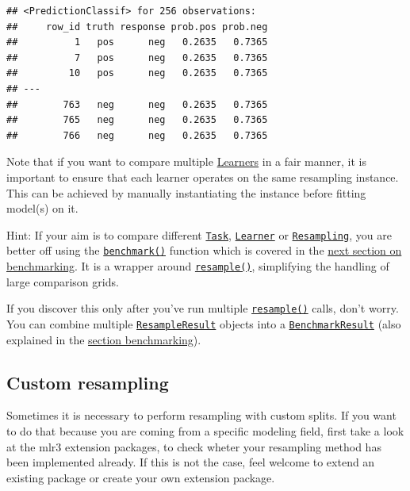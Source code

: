 \documentclass[]{scrbook}
\begin{document}
\begin{verbatim}
## <PredictionClassif> for 256 observations:
##     row_id truth response prob.pos prob.neg
##          1   pos      neg   0.2635   0.7365
##          7   pos      neg   0.2635   0.7365
##         10   pos      neg   0.2635   0.7365
## ---                                        
##        763   neg      neg   0.2635   0.7365
##        765   neg      neg   0.2635   0.7365
##        766   neg      neg   0.2635   0.7365
\end{verbatim}

Note that if you want to compare multiple \protect\hyperlink{learners}{Learners} in a fair manner, it is important to ensure that each learner operates on the same resampling instance.
This can be achieved by manually instantiating the instance before fitting model(s) on it.

Hint: If your aim is to compare different \href{https://mlr3.mlr-org.com/reference/Task.html}{\texttt{Task}}, \href{https://mlr3.mlr-org.com/reference/Learner.html}{\texttt{Learner}} or \href{https://mlr3.mlr-org.com/reference/Resampling.html}{\texttt{Resampling}}, you are better off using the \href{https://mlr3.mlr-org.com/reference/benchmark.html}{\texttt{benchmark()}} function which is covered in the \protect\hyperlink{benchmarking}{next section on benchmarking}.
It is a wrapper around \href{https://mlr3.mlr-org.com/reference/resample.html}{\texttt{resample()}}, simplifying the handling of large comparison grids.

If you discover this only after you've run multiple \href{https://mlr3.mlr-org.com/reference/resample.html}{\texttt{resample()}} calls, don't worry.
You can combine multiple \href{https://mlr3.mlr-org.com/reference/ResampleResult.html}{\texttt{ResampleResult}} objects into a \href{https://mlr3.mlr-org.com/reference/BenchmarkResult.html}{\texttt{BenchmarkResult}} (also explained in the \protect\hyperlink{benchmarking}{section benchmarking}).

\hypertarget{resamp-custom}{%
\subsection{Custom resampling}\label{resamp-custom}}

Sometimes it is necessary to perform resampling with custom splits.
If you want to do that because you are coming from a specific modeling field, first take a look at the mlr3 extension packages, to check wheter your resampling method has been implemented already.
If this is not the case, feel welcome to extend an existing package or create your own extension package.
\end{document}
